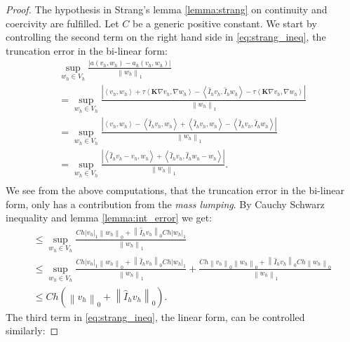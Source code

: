 \documentclass[../Main/main.tex]{subfiles}
\begin{document}
	\begin{proof}
		The hypothesis in Strang's lemma \ref{lemma:strang} on continuity and coercivity are fulfilled. Let $C$ be a generic positive constant.
		We start by controlling the second term on the right hand side in \eqref{eq:strang_ineq}, the truncation error in the bi-linear form:
		\begin{equation}
			\begin{gathered}
				\sup_{w_h\in V_h} \frac{|a(v_h,w_h)-a_h(v_h,w_h)|}{\left \|w_h \right \|_1} \\
				=\sup_{w_h\in V_h} \frac{|\left \langle v_h,w_h\right \rangle + \tau \left \langle\bm{K} \nabla v_h,\nabla w_h \right \rangle - \left \langle \hat{I}_h v_h, \hat{I}_h w_h \right \rangle - \tau \left \langle\bm{K} \nabla v_h, \nabla w_h \right \rangle|}{\left \| w_h \right \|_1} \\
				=\sup_{w_h\in V_h} \frac{|\left \langle v_h,w_h\right \rangle - \left \langle \hat{I}_h v_h, w_h \right \rangle + \left \langle \hat{I}_h v_h, w_h \right \rangle - \left \langle \hat{I}_h v_h, \hat{I}_h w_h \right \rangle|}{\left \| w_h \right \|_1}\\
				= \sup_{w_h\in V_h}\frac{|\left \langle \hat{I}_h v_h - v_h,w_h \right \rangle + \left \langle \hat{I}_h v_h, \hat{I}_h w_h - w_h \right \rangle |}{\left \| w_h \right \|_1}. \\
			\end{gathered}
		\end{equation}
		We see from the above computations, that the truncation error in the bi-linear form, only has a contribution from the \emph{mass lumping}.
		By Cauchy Schwarz inequality and lemma \ref{lemma:int_error} we get:
		\begin{equation}
			\begin{gathered}
				\leq \sup_{w_h\in V_h}\frac{Ch| v_h|_1\left \| w_h \right \|_0  + \left \|\hat{I}_h v_h\right \|_0 Ch|w_h|_1}{\left \| w_h \right \|_1}\\
				\leq 				 \sup_{w_h\in V_h}\frac{Ch| v_h|_1\left \| w_h \right \|_0  + \left \|\hat{I}_h v_h\right \|_0 Ch|w_h|_1}{\left \| w_h \right \|_1} + \frac{Ch\left \| v_h \right \|_0 \left \| w_h \right \|_0 + \left \|\hat{I}_h v_h\right \|_0 Ch\left \| w_h \right \|_0}{\left \| w_h \right \|_1}\\
				\leq Ch \left (\left \| v_h \right \|_0 + \left \| \hat{I}_h v_h \right \|_0 \right ).
			\end{gathered}
		\end{equation}
		The third term in \eqref{eq:strang_ineq}, the linear form, can be controlled similarly:

\end{proof}
\end{document}
